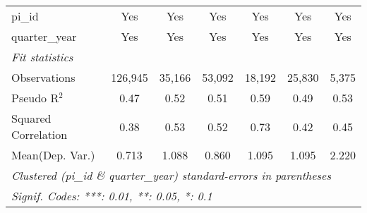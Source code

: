 \begin{tabular}{lcccccc}
   pi\_id                                                     & Yes           & Yes           & Yes           & Yes           & Yes           & Yes\\  
   quarter\_year                                              & Yes           & Yes           & Yes           & Yes           & Yes           & Yes\\  
   \midrule
   \emph{Fit statistics}\\
   Observations                                               & 126,945       & 35,166        & 53,092        & 18,192        & 25,830        & 5,375\\  
   Pseudo R$^2$                                               & 0.47          & 0.52          & 0.51          & 0.59          & 0.49          & 0.53\\  
   Squared Correlation                                        & 0.38          & 0.53          & 0.52          & 0.73          & 0.42          & 0.45\\  
Mean(Dep. Var.) & 0.713 & 1.088 & 0.860 & 1.095 & 1.095 & 2.220 \\
   \midrule \midrule
   \multicolumn{7}{l}{\emph{Clustered (pi\_id \& quarter\_year) standard-errors in parentheses}}\\
   \multicolumn{7}{l}{\emph{Signif. Codes: ***: 0.01, **: 0.05, *: 0.1}}\\
\end{tabular}
\par\endgroup
